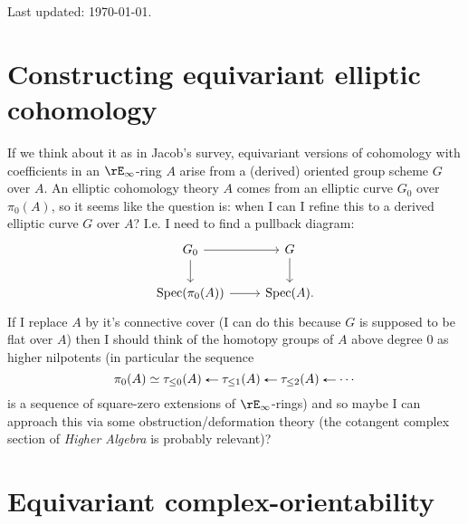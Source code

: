 



\thispagestyle{fancy}

\begin{flushleft}
  Last updated: \today.
\end{flushleft}

\medskip


\section{Constructing equivariant elliptic cohomology}

\begin{ideas}
\item If we think about it as in Jacob's survey, equivariant
  versions of cohomology with coefficients in an $\rE_\infty$-ring
  $A$ arise from a (derived) oriented group scheme $G$ over $A$. An
  elliptic cohomology theory $A$ comes from an elliptic curve $G_0$
  over $\pi_0(A)$, so it seems like the question is: when I can I
  refine this to a derived elliptic curve $G$ over $A$? I.e. I need
  to find a pullback diagram:
  \[
  \begin{tikzcd}
    G_0 \ar[r] \ar[d] & G \ar[d] \\
    \Spec(\pi_0(A)) \ar[r] & \Spec(A).
  \end{tikzcd}
  \]
  If I replace $A$ by it's connective cover (I can do this because
  $G$ is supposed to be flat over $A$) then I should think of the
  homotopy groups of $A$ above degree $0$ as higher nilpotents (in
  particular the sequence
  \[
  \pi_0(A) \iso \tau_{\le 0}(A) \from \tau_{\le 1}(A) \from
  \tau_{\le 2}(A) \from \cdots
  \]
  is a sequence of square-zero extensions of $\rE_\infty$-rings) and
  so maybe I can approach this via some obstruction/deformation
  theory (the cotangent complex section of \emph{Higher Algebra} is
  probably relevant)?
\end{ideas}


\section{Equivariant complex-orientability}

